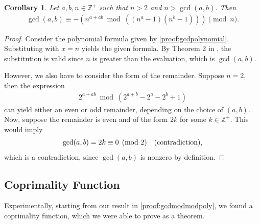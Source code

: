 \documentclass{article}
\theoremstyle{plain}
\newtheorem{corollary}[theorem]{Corollary}
\theoremstyle{definition}
\newcommand{\Z}{\mathbb{Z}}
\begin{document}
\begin{corollary} \label{proof:gcdmodmodintegerbase}
Let $a,b,n \in \Z^+$ such that $n > 2$ and $n > \gcd(a,b)$. Then
\begin{align*}
\gcd(a,b) \equiv -\left( n^{a+ab} \bmod \left((n^a-1)(n^b-1)\right) \right) \pmod n.
\end{align*}
\end{corollary}
\begin{proof}
Consider the polynomial formula given by \cref{proof:gcdpolynomial}. Substituting with $x = n$ yields the given formula. By Theorem 2 in  \cite{shunia2024polynomial}, the substitution is valid since $n$ is greater than the evaluation, which is $\gcd(a,b)$.

However, we also have to consider the form of the remainder. Suppose $n = 2$, then the expression
\begin{align*}
2^{a+ab} \bmod(2^{a+b}-2^a-2^b+1)
\end{align*}
can yield either an even or odd remainder, depending on the choice of $(a,b)$. Now, suppose the remainder is even and of the form $2k$ for some $k \in \mathbb{Z}^+$. This would imply 
\begin{align*}
\gcd(a,b) = 2k \equiv 0 \pmod 2 \quad \textup{(contradiction)} ,
\end{align*}
which is a contradiction, since $\gcd(a,b)$ is nonzero by definition.
\end{proof}

\subsection{Coprimality Function}
Experimentally, starting from our result in \cref{proof:gcdmodmodpoly}, we found a coprimality function, which we were able to prove as a theorem.
\end{document}

